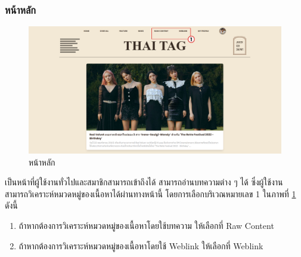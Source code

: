 \documentclass[12pt,oneside,openright,a4paper]{cpe-thai-project}
\begin{document}
        \subsubsection{หน้าหลัก}
          \begin{figure}[!ht]\centering
            \includegraphics[width=\textwidth]{./img/project_ui/4_4.png}
            \caption{หน้าหลัก}\label{fig:exp_home}
          \end{figure}
          \hspace{1cm}เป็นหน้าที่ผู้ใช้งานทั่วไปและสมาชิกสามารถเข้าถึงได้ สามารถอ่านบทความต่าง ๆ ได้ ซึ่งผู้ใช้งานสามารถวิเคราะห์หมวดหมู่ของเนื้อหาได้ผ่านทางหน้านี้
          โดยการเลือกบริเวณหมายเลข 1 ในภาพที่ \ref{fig:exp_home} ดังนี้
          \begin{enumerate}
            \item ถ้าหากต้องการวิเคราะห์หมวดหมู่ของเนื้อหาโดยใช้บทความ ให้เลือกที่ Raw Content
            \item ถ้าหากต้องการวิเคราะห์หมวดหมู่ของเนื้อหาโดยใช้ Weblink ให้เลือกที่ Weblink
          \end{enumerate}
\end{document}
